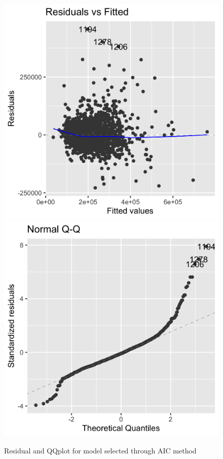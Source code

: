 \documentclass[letterpaper,8pt,twocolumn,twoside,]{pinp}
\begin{document}
\begin{figure}[h]

{\centering \includegraphics[width=0.49\linewidth]{plot1} \includegraphics[width=0.49\linewidth]{plot2} 

}

\caption{Residual and QQplot for model selected through AIC method}\label{fig:Assumption check simple}
\end{figure}
\end{document}
